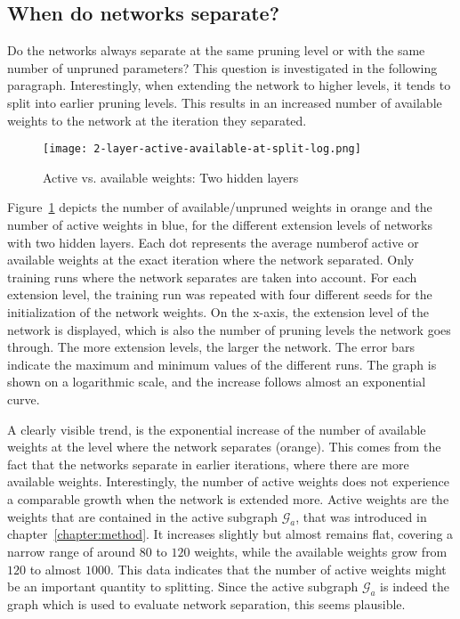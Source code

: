 \subsection{When do networks separate?}
Do the networks always separate at the same pruning level or with the same number of unpruned parameters?
This question is investigated in the following paragraph.
Interestingly, when extending the network to higher levels, it tends to split into earlier pruning levels.
This results in an increased number of available weights to the network at the iteration they separated.
\begin{figure}[ht] %
    \centering
    \texttt{[image: 2-layer-active-available-at-split-log.png]}
    \caption{Active vs. available weights: Two hidden layers}\label{fig:2l-active-split}
\end{figure}
Figure~\ref{fig:2l-active-split} depicts the number of available/unpruned weights in orange and the number of active weights in blue, for the different extension levels of networks with two hidden layers.
Each dot represents the average numberof active or available weights at the exact iteration where the network separated.
Only training runs where the network separates are taken into account.
For each extension level, the training run was repeated with four different seeds for the initialization of the network weights.
On the x-axis, the extension level of the network is displayed, which is also the number of pruning levels the network goes through.
The more extension levels, the larger the network.
The error bars indicate the maximum and minimum values of the different runs.
The graph is shown on a logarithmic scale, and the increase follows almost an exponential curve.

A clearly visible trend, is the exponential increase of the number of available weights at the level where the network separates (orange).
This comes from the fact that the networks separate in earlier iterations, where there are more available weights.
Interestingly, the number of active weights does not experience a comparable growth when the network is extended more.
Active weights are the weights that are contained in the active subgraph $\mathcal{G}_a$, that was introduced in chapter~\ref{chapter:method}.
It increases slightly but almost remains flat, covering a narrow range of around $80$ to $120$ weights, while the available weights grow from $120$ to almost $1000$.
This data indicates that the number of active weights might be an important quantity to splitting.
Since the active subgraph $\mathcal{G}_a$ is indeed the graph which is used to evaluate network separation, this seems plausible.
 
